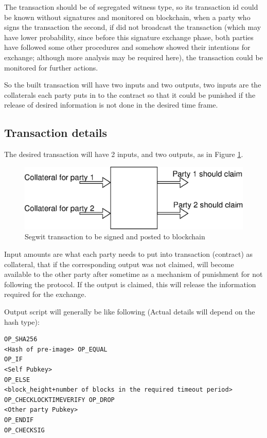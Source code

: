 \documentclass[]{article}
\begin{document}
The transaction should be of segregated witness \cite{segwit} type, so its transaction id could be known without signatures and monitored on blockchain, when a party who signs the transaction the second, if did not broadcast the transaction (which may have lower probability, since before this signature exchange phase, both parties have followed some other procedures and somehow showed their intentions for exchange; although more analysis may be required here), the transaction could be monitored for further actions.

So the built transaction will have two inputs and two outputs, two inputs are the collaterals each party puts in to the contract so that it could be punished if the release of desired information is not done in the desired time frame.

\subsection{Transaction details}

The desired transaction will have 2 inputs, and two outputs, as in Figure \ref{fig:transaction}.

\begin{figure}[h!]
	\centering
	\includegraphics[width=1\textwidth]{images/transaction.eps}
	\caption{Segwit transaction	to be signed and posted to blockchain}
	\label{fig:transaction}
\end{figure}

Input amounts are what each party needs to put into transaction (contract) as collateral, that if the corresponding output was not claimed, will become available to the other party after sometime as a mechanism of punishment for not following the protocol. If the output is claimed, this will release the information required for the exchange.

Output script will generally be like following (Actual details will depend on the hash type):

\begin{verbatim}
OP_SHA256
<Hash of pre-image> OP_EQUAL
OP_IF
<Self Pubkey>
OP_ELSE
<block_height+number of blocks in the required timeout period> OP_CHECKLOCKTIMEVERIFY OP_DROP
<Other party Pubkey>
OP_ENDIF
OP_CHECKSIG
\end{verbatim}
\end{document}
